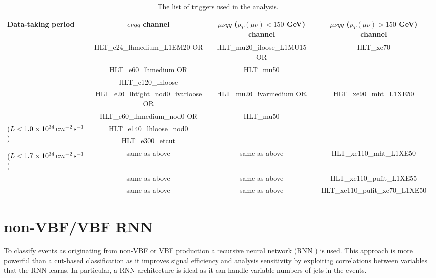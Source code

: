 \begin{landscape}
\begin{table}[p]
  \caption{The list of triggers used in the analysis.} \label{tbl:triggers}
\begin{center} 
\small
\begin{tabular}{|l|c|c|c|}
\hline
Data-taking period & $e\nu qq$ channel & $\mu\nu qq$ ($p_{T}(\mu\nu)<150$ GeV) channel & $\mu\nu qq$ ($p_{T}(\mu\nu) > 150$ GeV) channel  \\
\hline
\hline
\multirow{3}{*}{\centering {2015}} & HLT\_e24\_lhmedium\_L1EM20 OR & HLT\_mu20\_iloose\_L1MU15 OR & \multirow{3}{*}{ HLT\_xe70 } \\
 & HLT\_e60\_lhmedium OR & HLT\_mu50 & \\
 & HLT\_e120\_lhloose & & \\
\hline
\multirow{2}{*}{\centering {2016a (run $< 302919$)}} & HLT\_e26\_lhtight\_nod0\_ivarloose OR & HLT\_mu26\_ivarmedium OR  & \multirow{3}{*}{ HLT\_xe90\_mht\_L1XE50 } \\
 & HLT\_e60\_lhmedium\_nod0 OR & HLT\_mu50 &  \\ 
\multirow{2}{*}{($L<1.0\times10^{34}\,{\textrm cm}^{-2}\,{\textrm s}^{-1}$)} & HLT\_e140\_lhloose\_nod0 & & \\
 & HLT\_e300\_etcut & & \\
\hline
{\centering {2016b (run $\geq 302919$)}} & \multirow{2}{*}{same as above} & \multirow{2}{*}{same as above}  &  \multirow{2}{*}{HLT\_xe110\_mht\_L1XE50} \\
($L<1.7\times10^{34}\,{\textrm cm}^{-2}\,{\textrm s}^{-1}$) & & &\\
\hline
{\centering {2017}} & same as above & same as above  &  HLT\_xe110\_pufit\_L1XE55 \\
\hline
{\centering {2018}} & same as above & same as above  &  HLT\_xe110\_pufit\_xe70\_L1XE50  \\
\hline
\end{tabular}
\end{center}
\end{table}
\end{landscape}
\section{non-VBF/VBF RNN}
To classify events as originating from non-VBF or VBF production a recursive neural network (RNN \cite{rnn}) is used. This approach is more powerful than a cut-based classification as it improves signal efficiency and analysis sensitivity by exploiting correlations between variables that the RNN learns. In particular, a RNN architecture is ideal as it can handle variable numbers of jets in the events.  

